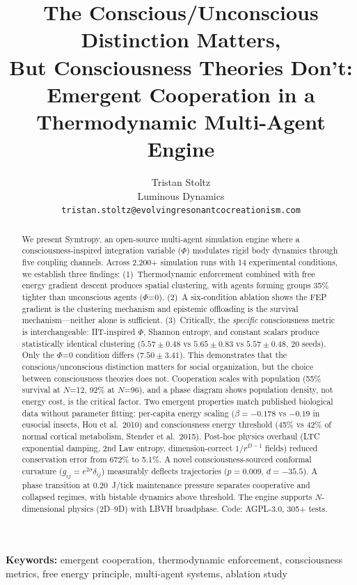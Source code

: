 \documentclass[letterpaper]{article}
\title{\textbf{The Conscious/Unconscious Distinction Matters,\\But Consciousness Theories Don't:\\Emergent Cooperation in a Thermodynamic Multi-Agent Engine}}
\author{Tristan Stoltz\\
Luminous Dynamics\\
\texttt{tristan.stoltz@evolvingresonantcocreationism.com}}
\date{}
\begin{document}
\maketitle

\begin{abstract}
We present Symtropy, an open-source multi-agent simulation engine where a consciousness-inspired integration variable ($\Phi$) modulates rigid body dynamics through five coupling channels. Across 2,200+ simulation runs with 14 experimental conditions, we establish three findings: (1)~Thermodynamic enforcement combined with free energy gradient descent produces spatial clustering, with agents forming groups 35\% tighter than unconscious agents ($\Phi$=0). (2)~A six-condition ablation shows the FEP gradient is the clustering mechanism and epistemic offloading is the survival mechanism---neither alone is sufficient. (3)~Critically, the \emph{specific} consciousness metric is interchangeable: IIT-inspired $\Phi$, Shannon entropy, and constant scalars produce statistically identical clustering ($5.57 \pm 0.48$ vs $5.65 \pm 0.83$ vs $5.57 \pm 0.48$, 20 seeds). Only the $\Phi$=0 condition differs ($7.50 \pm 3.41$). This demonstrates that the conscious/unconscious distinction matters for social organization, but the choice between consciousness theories does not. Cooperation scales with population (55\% survival at $N$=12, 92\% at $N$=96), and a phase diagram shows population density, not energy cost, is the critical factor. Two emergent properties match published biological data without parameter fitting: per-capita energy scaling ($\beta = -0.178$ vs $-0.19$ in eusocial insects, Hou et al.\ 2010) and consciousness energy threshold (45\% vs 42\% of normal cortical metabolism, Stender et al.\ 2015). Post-hoc physics overhaul (LTC exponential damping, 2nd Law entropy, dimension-correct $1/r^{D-1}$ fields) reduced conservation error from 672\% to 5.1\%. A novel consciousness-sourced conformal curvature ($g_{ij} = e^{2\sigma}\delta_{ij}$) measurably deflects trajectories ($p = 0.009$, $d = -35.5$). A phase transition at 0.20~J/tick maintenance pressure separates cooperative and collapsed regimes, with bistable dynamics above threshold. The engine supports $N$-dimensional physics (2D--9D) with LBVH broadphase. Code: AGPL-3.0, 305+ tests.
\end{abstract}

\textbf{Keywords:} emergent cooperation, thermodynamic enforcement, consciousness metrics, free energy principle, multi-agent systems, ablation study
\end{document}
